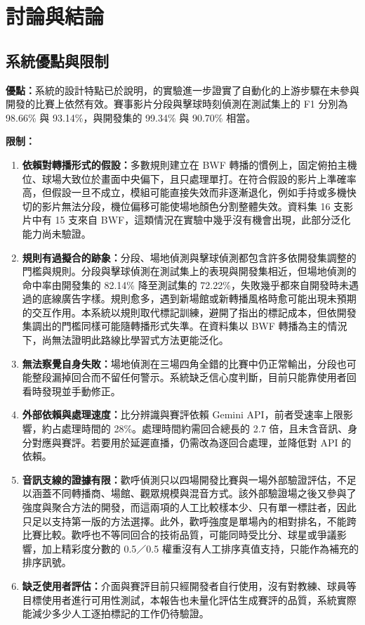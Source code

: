 \chapter{討論與結論}
\label{ch:conclusion}

\section{系統優點與限制}
\label{sec:strengths-limitations}

\textbf{優點：}系統的設計特點已於說明，的實驗進一步證實了自動化的上游步驟在未參與開發的比賽上依然有效。賽事影片分段與擊球時刻偵測在測試集上的 F1 分別為 98.66\% 與 93.14\%，與開發集的 99.34\% 與 90.70\% 相當。

\textbf{限制：}

\begin{enumerate}
  \item \textbf{依賴對轉播形式的假設：}多數規則建立在 BWF 轉播的慣例上，固定俯拍主機位、球場大致位於畫面中央偏下，且只處理單打。在符合假設的影片上準確率高，但假設一旦不成立，模組可能直接失效而非逐漸退化，例如手持或多機快切的影片無法分段，機位偏移可能使場地顏色分割整體失效。資料集 16 支影片中有 15 支來自 BWF，這類情況在實驗中幾乎沒有機會出現，此部分泛化能力尚未驗證。
  \item \textbf{規則有過擬合的跡象：}分段、場地偵測與擊球偵測都包含許多依開發集調整的門檻與規則。分段與擊球偵測在測試集上的表現與開發集相近，但場地偵測的命中率由開發集的 82.14\% 降至測試集的 72.22\%，失敗幾乎都來自開發時未遇過的底線廣告字樣。規則愈多，遇到新場館或新轉播風格時愈可能出現未預期的交互作用。本系統以規則取代標記訓練，避開了指出的標記成本，但依開發集調出的門檻同樣可能隨轉播形式失準。在資料集以 BWF 轉播為主的情況下，尚無法證明此路線比學習式方法更能泛化。
  \item \textbf{無法察覺自身失敗：}場地偵測在三場四角全錯的比賽中仍正常輸出，分段也可能整段漏掉回合而不留任何警示。系統缺乏信心度判斷，目前只能靠使用者回看時發現並手動修正。
  \item \textbf{外部依賴與處理速度：}比分辨識與賽評依賴 Gemini API，前者受速率上限影響，約占處理時間的 28\%。處理時間約需回合總長的 2.7 倍，且未含音訊、身分對應與賽評。若要用於延遲直播，仍需改為逐回合處理，並降低對 API 的依賴。
  \item \textbf{音訊支線的證據有限：}歡呼偵測只以四場開發比賽與一場外部驗證評估，不足以涵蓋不同轉播商、場館、觀眾規模與混音方式。該外部驗證場之後又參與了強度與聚合方法的開發，而這兩項的人工比較樣本少、只有單一標註者，因此只足以支持第一版的方法選擇。此外，歡呼強度是單場內的相對排名，不能跨比賽比較。歡呼也不等同回合的技術品質，可能同時受比分、球星或爭議影響，加上精彩度分數的 0.5／0.5 權重沒有人工排序真值支持，只能作為補充的排序訊號。
  \item \textbf{缺乏使用者評估：}介面與賽評目前只經開發者自行使用，沒有對教練、球員等目標使用者進行可用性測試，本報告也未量化評估生成賽評的品質，系統實際能減少多少人工逐拍標記的工作仍待驗證。
\end{enumerate}

